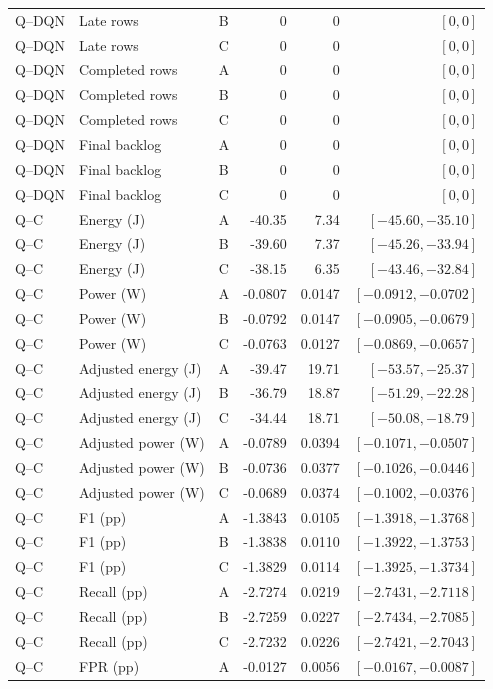 \begin{longtable}{lllrrr}
Q--DQN & Late rows & B & 0 & 0 & $[0,0]$\\
Q--DQN & Late rows & C & 0 & 0 & $[0,0]$\\
Q--DQN & Completed rows & A & 0 & 0 & $[0,0]$\\
Q--DQN & Completed rows & B & 0 & 0 & $[0,0]$\\
Q--DQN & Completed rows & C & 0 & 0 & $[0,0]$\\
Q--DQN & Final backlog & A & 0 & 0 & $[0,0]$\\
Q--DQN & Final backlog & B & 0 & 0 & $[0,0]$\\
Q--DQN & Final backlog & C & 0 & 0 & $[0,0]$\\
Q--C & Energy (J) & A & -40.35 & 7.34 & $[-45.60,-35.10]$\\
Q--C & Energy (J) & B & -39.60 & 7.37 & $[-45.26,-33.94]$\\
Q--C & Energy (J) & C & -38.15 & 6.35 & $[-43.46,-32.84]$\\
Q--C & Power (W) & A & -0.0807 & 0.0147 & $[-0.0912,-0.0702]$\\
Q--C & Power (W) & B & -0.0792 & 0.0147 & $[-0.0905,-0.0679]$\\
Q--C & Power (W) & C & -0.0763 & 0.0127 & $[-0.0869,-0.0657]$\\
Q--C & Adjusted energy (J) & A & -39.47 & 19.71 & $[-53.57,-25.37]$\\
Q--C & Adjusted energy (J) & B & -36.79 & 18.87 & $[-51.29,-22.28]$\\
Q--C & Adjusted energy (J) & C & -34.44 & 18.71 & $[-50.08,-18.79]$\\
Q--C & Adjusted power (W) & A & -0.0789 & 0.0394 & $[-0.1071,-0.0507]$\\
Q--C & Adjusted power (W) & B & -0.0736 & 0.0377 & $[-0.1026,-0.0446]$\\
Q--C & Adjusted power (W) & C & -0.0689 & 0.0374 & $[-0.1002,-0.0376]$\\
Q--C & F1 (pp) & A & -1.3843 & 0.0105 & $[-1.3918,-1.3768]$\\
Q--C & F1 (pp) & B & -1.3838 & 0.0110 & $[-1.3922,-1.3753]$\\
Q--C & F1 (pp) & C & -1.3829 & 0.0114 & $[-1.3925,-1.3734]$\\
Q--C & Recall (pp) & A & -2.7274 & 0.0219 & $[-2.7431,-2.7118]$\\
Q--C & Recall (pp) & B & -2.7259 & 0.0227 & $[-2.7434,-2.7085]$\\
Q--C & Recall (pp) & C & -2.7232 & 0.0226 & $[-2.7421,-2.7043]$\\
Q--C & FPR (pp) & A & -0.0127 & 0.0056 & $[-0.0167,-0.0087]$\\

\end{longtable}
